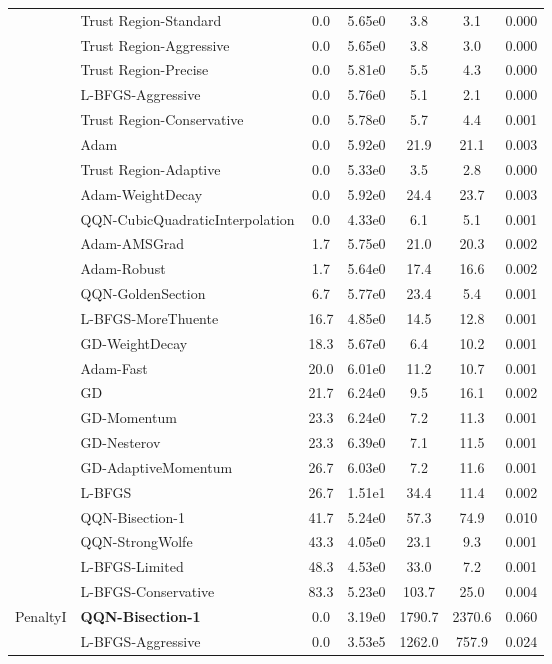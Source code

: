 \documentclass{article}
\begin{document}
\begin{table}[htbp]
{\begin{tabular}{p{2.5cm}p{2.5cm}*{5}{c}}
 & Trust Region-Standard & 0.0 & 5.65e0 & 3.8 & 3.1 & 0.000 \\
 & Trust Region-Aggressive & 0.0 & 5.65e0 & 3.8 & 3.0 & 0.000 \\
 & Trust Region-Precise & 0.0 & 5.81e0 & 5.5 & 4.3 & 0.000 \\
 & L-BFGS-Aggressive & 0.0 & 5.76e0 & 5.1 & 2.1 & 0.000 \\
 & Trust Region-Conservative & 0.0 & 5.78e0 & 5.7 & 4.4 & 0.001 \\
 & Adam & 0.0 & 5.92e0 & 21.9 & 21.1 & 0.003 \\
 & Trust Region-Adaptive & 0.0 & 5.33e0 & 3.5 & 2.8 & 0.000 \\
 & Adam-WeightDecay & 0.0 & 5.92e0 & 24.4 & 23.7 & 0.003 \\
 & QQN-CubicQuadraticInterpolation & 0.0 & 4.33e0 & 6.1 & 5.1 & 0.001 \\
 & Adam-AMSGrad & 1.7 & 5.75e0 & 21.0 & 20.3 & 0.002 \\
 & Adam-Robust & 1.7 & 5.64e0 & 17.4 & 16.6 & 0.002 \\
 & QQN-GoldenSection & 6.7 & 5.77e0 & 23.4 & 5.4 & 0.001 \\
 & L-BFGS-MoreThuente & 16.7 & 4.85e0 & 14.5 & 12.8 & 0.001 \\
 & GD-WeightDecay & 18.3 & 5.67e0 & 6.4 & 10.2 & 0.001 \\
 & Adam-Fast & 20.0 & 6.01e0 & 11.2 & 10.7 & 0.001 \\
 & GD & 21.7 & 6.24e0 & 9.5 & 16.1 & 0.002 \\
 & GD-Momentum & 23.3 & 6.24e0 & 7.2 & 11.3 & 0.001 \\
 & GD-Nesterov & 23.3 & 6.39e0 & 7.1 & 11.5 & 0.001 \\
 & GD-AdaptiveMomentum & 26.7 & 6.03e0 & 7.2 & 11.6 & 0.001 \\
 & L-BFGS & 26.7 & 1.51e1 & 34.4 & 11.4 & 0.002 \\
 & QQN-Bisection-1 & 41.7 & 5.24e0 & 57.3 & 74.9 & 0.010 \\
 & QQN-StrongWolfe & 43.3 & 4.05e0 & 23.1 & 9.3 & 0.001 \\
 & L-BFGS-Limited & 48.3 & 4.53e0 & 33.0 & 7.2 & 0.001 \\
 & L-BFGS-Conservative & 83.3 & 5.23e0 & 103.7 & 25.0 & 0.004 \\
\midrule
\multirow{25}{*}{PenaltyI} & \textbf{QQN-Bisection-1} & 0.0 & 3.19e0 & 1790.7 & 2370.6 & 0.060 \\
 & L-BFGS-Aggressive & 0.0 & 3.53e5 & 1262.0 & 757.9 & 0.024 \\

\end{tabular}}
\end{table}
\end{document}
